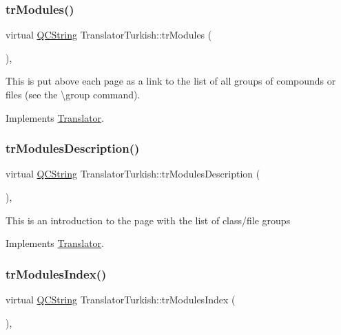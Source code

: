\subsubsection{\texorpdfstring{trModules()}{trModules()}}
{\footnotesize\ttfamily virtual \mbox{\hyperlink{class_q_c_string}{Q\+C\+String}} Translator\+Turkish\+::tr\+Modules (\begin{DoxyParamCaption}{ }\end{DoxyParamCaption})\hspace{0.3cm}{\ttfamily [inline]}, {\ttfamily [virtual]}}

This is put above each page as a link to the list of all groups of compounds or files (see the \textbackslash{}group command). 

Implements \mbox{\hyperlink{class_translator}{Translator}}.

\mbox{\label{class_translator_turkish_ae1d47a6b31a44a31a1d2bccdfce71c41}} 
\subsubsection{\texorpdfstring{trModulesDescription()}{trModulesDescription()}}
{\footnotesize\ttfamily virtual \mbox{\hyperlink{class_q_c_string}{Q\+C\+String}} Translator\+Turkish\+::tr\+Modules\+Description (\begin{DoxyParamCaption}{ }\end{DoxyParamCaption})\hspace{0.3cm}{\ttfamily [inline]}, {\ttfamily [virtual]}}

This is an introduction to the page with the list of class/file groups 

Implements \mbox{\hyperlink{class_translator}{Translator}}.

\mbox{\label{class_translator_turkish_a2f94d764fad520fa92d7aa899c430fc6}} 
\subsubsection{\texorpdfstring{trModulesIndex()}{trModulesIndex()}}
{\footnotesize\ttfamily virtual \mbox{\hyperlink{class_q_c_string}{Q\+C\+String}} Translator\+Turkish\+::tr\+Modules\+Index (\begin{DoxyParamCaption}{ }\end{DoxyParamCaption})\hspace{0.3cm}{\ttfamily [inline]}, {\ttfamily [virtual]}}

